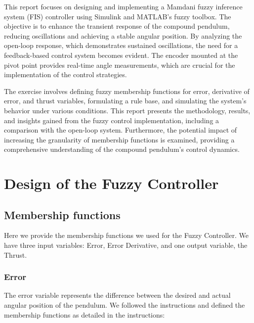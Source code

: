 \documentclass[12pt]{article}
\begin{document}
This report focuses on designing and implementing a Mamdani fuzzy inference system (FIS) controller using Simulink and MATLAB's fuzzy toolbox. The objective is to enhance the transient response of the compound pendulum, reducing oscillations and achieving a stable angular position. By analyzing the open-loop response, which demonstrates sustained oscillations, the need for a feedback-based control system becomes evident. The encoder mounted at the pivot point provides real-time angle measurements, which are crucial for the implementation of the control strategies.

The exercise involves defining fuzzy membership functions for error, derivative of error, and thrust variables, formulating a rule base, and simulating the system's behavior under various conditions. This report presents the methodology, results, and insights gained from the fuzzy control implementation, including a comparison with the open-loop system. Furthermore, the potential impact of increasing the granularity of membership functions is examined, providing a comprehensive understanding of the compound pendulum's control dynamics.


\section{Design of the Fuzzy Controller}
\label{sec:desig}

\subsection{Membership functions}

Here we provide the membership functions we used for the Fuzzy Controller. We have three input variables: Error, Error Derivative, and one output variable, the Thrust. 

\subsubsection{Error}

The error variable represents the difference between the desired and actual angular position of the pendulum. We followed the instructions and defined the membership functions as detailed in the instructions:
\end{document}
